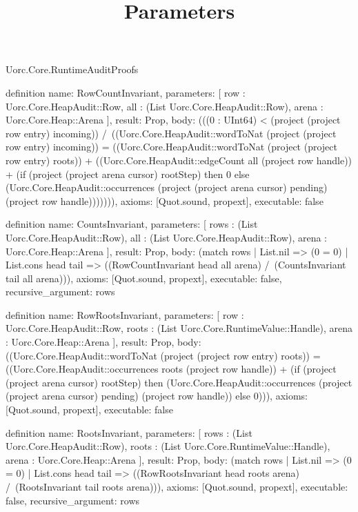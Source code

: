 \begin{lexlean}{Uorc.Core.RuntimeAuditProofs}
\title{Parameters}
\begin{semanticmodule}
definition{
  name: RowCountInvariant,
  parameters: [
    row : Uorc.Core.HeapAudit::Row,
    all : (List Uorc.Core.HeapAudit::Row),
    arena : Uorc.Core.Heap::Arena
  ],
  result: Prop,
  body: (((0 : UInt64) < (project (project row entry) incoming)) /\ ((Uorc.Core.HeapAudit::wordToNat (project (project row entry) incoming)) = ((Uorc.Core.HeapAudit::wordToNat (project (project row entry) roots)) + ((Uorc.Core.HeapAudit::edgeCount all (project row handle)) + (if (project (project arena cursor) rootStep) then 0 else (Uorc.Core.HeapAudit::occurrences (project (project arena cursor) pending) (project row handle))))))),
  axioms: [Quot.sound, propext],
  executable: false
}

definition{
  name: CountsInvariant,
  parameters: [
    rows : (List Uorc.Core.HeapAudit::Row),
    all : (List Uorc.Core.HeapAudit::Row),
    arena : Uorc.Core.Heap::Arena
  ],
  result: Prop,
  body: (match rows
    | List.nil => (0 = 0)
    | List.cons head tail => ((RowCountInvariant head all arena) /\ (CountsInvariant tail all arena))),
  axioms: [Quot.sound, propext],
  executable: false,
  recursive_argument: rows
}

definition{
  name: RowRootsInvariant,
  parameters: [
    row : Uorc.Core.HeapAudit::Row,
    roots : (List Uorc.Core.RuntimeValue::Handle),
    arena : Uorc.Core.Heap::Arena
  ],
  result: Prop,
  body: ((Uorc.Core.HeapAudit::wordToNat (project (project row entry) roots)) = ((Uorc.Core.HeapAudit::occurrences roots (project row handle)) + (if (project (project arena cursor) rootStep) then (Uorc.Core.HeapAudit::occurrences (project (project arena cursor) pending) (project row handle)) else 0))),
  axioms: [Quot.sound, propext],
  executable: false
}

definition{
  name: RootsInvariant,
  parameters: [
    rows : (List Uorc.Core.HeapAudit::Row),
    roots : (List Uorc.Core.RuntimeValue::Handle),
    arena : Uorc.Core.Heap::Arena
  ],
  result: Prop,
  body: (match rows
    | List.nil => (0 = 0)
    | List.cons head tail => ((RowRootsInvariant head roots arena) /\ (RootsInvariant tail roots arena))),
  axioms: [Quot.sound, propext],
  executable: false,
  recursive_argument: rows
}


\end{semanticmodule}
\end{lexlean}
